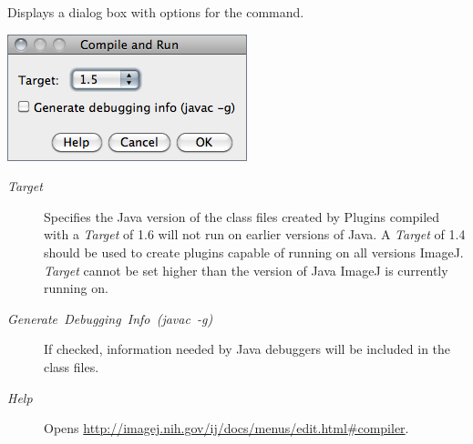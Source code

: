 Displays a dialog box with options for the 
command.\vspace*{\bigskipamount}


\begin{minipage}[c][1\totalheight][t]{0.37\columnwidth}%
\includegraphics[scale=0.55]{images/Compiler}%
\end{minipage}%
\begin{minipage}[c][1\totalheight][t]{0.63\columnwidth}%
\begin{description}
\item [{\emph{Target}}] Specifies the Java version of the class files created
by 
Plugins compiled with a \emph{Target} of 1.6 will not run on earlier
versions of Java. A \emph{Target} of 1.4 should be used to create
plugins capable of running on all versions ImageJ. \emph{Target} cannot
be set higher than the version of Java ImageJ is currently running
on.\end{description}
%
\end{minipage}
\begin{description}
\item [{\emph{Generate\ Debugging\ Info\ (javac\ -g)}}] If checked,
information needed by Java debuggers will be included
in the class files.
\item [{\emph{Help}}] Opens \url{http://imagej.nih.gov/ij/docs/menus/edit.html#compiler}.
\end{description}

\subsubsection[\protect\userinterface{DICOM\ldots{}}]{\protect{}\label{sub:DICOM...}}

